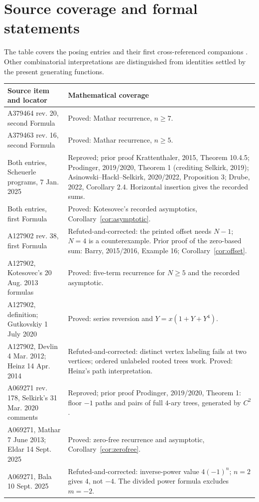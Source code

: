 \documentclass[11pt]{article}
\begin{document}
\section{Source coverage and formal statements}\label{sec:coverage}
The table covers the posing entries and their first cross-referenced
companions \cite{oeis4,oeis5,oeis6}. Other combinatorial interpretations are distinguished from
identities settled by the present generating functions.
\begingroup\small
\begin{longtable}{@{}p{.32\linewidth}p{.62\linewidth}@{}}
\toprule Source item and locator & Mathematical coverage\\\midrule\endhead
A379464 rev. 20, second Formula & Proved: Mathar recurrence, $n\geq7$.\\
A379463 rev. 16, second Formula & Proved: Mathar recurrence, $n\geq5$.\\
Both entries, Scheuerle programs, 7 Jan. 2025 & Reproved; prior proof Krattenthaler, 2015, Theorem 10.4.5; Prodinger, 2019/2020, Theorem 1 (crediting Selkirk, 2019); Asinowski--Hackl--Selkirk, 2020/2022, Proposition 3; Drube, 2022, Corollary 2.4. Horizontal insertion gives the recorded sums.\\
Both entries, first Formula & Proved: Kotesovec's recorded asymptotics, Corollary~\ref{cor:asymptotic}.\\
A127902 rev. 38, first Formula & Refuted-and-corrected: the printed offset needs $N-1$; $N=4$ is a counterexample. Prior proof of the zero-based sum: Barry, 2015/2016, Example 16; Corollary~\ref{cor:offset}.\\
A127902, Kotesovec's 20 Aug. 2013 formulas & Proved: five-term recurrence for $N\geq5$ and the recorded asymptotic.\\
A127902, definition; Gutkovskiy 1 July 2020 & Proved: series reversion and $Y=x(1+Y+Y^4)$.\\
A127902, Devlin 4 Mar. 2012; Heinz 14 Apr. 2014 & Refuted-and-corrected: distinct vertex labeling fails at two vertices; ordered unlabeled rooted trees work. Proved: Heinz's path interpretation.\\
A069271 rev. 178, Selkirk's 31 Mar. 2020 comments & Reproved; prior proof Prodinger, 2019/2020, Theorem 1: floor $-1$ paths and pairs of full $4$-ary trees, generated by $C^2$.\\
A069271, Mathar 7 June 2013; Eldar 14 Sept. 2025 & Proved: zero-free recurrence and asymptotic, Corollary~\ref{cor:zerofree}.\\
A069271, Bala 10 Sept. 2025 & Refuted-and-corrected: inverse-power value $4(-1)^n$; $n=2$ gives $4$, not $-4$. The divided power formula excludes $m=-2$.\\

\end{longtable}
\end{document}
